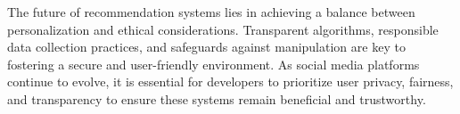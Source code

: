 \documentclass[10pt,twocolumn,twoside,a4paper]{article} %
\begin{document}
The future of recommendation systems lies in achieving a balance between personalization and ethical considerations. Transparent algorithms, responsible data collection practices, and safeguards against manipulation are key to fostering a secure and user-friendly environment. As social media platforms continue to evolve, it is essential for developers to prioritize user privacy, fairness, and transparency to ensure these systems remain beneficial and trustworthy.

\nocite{*}


\end{document}
